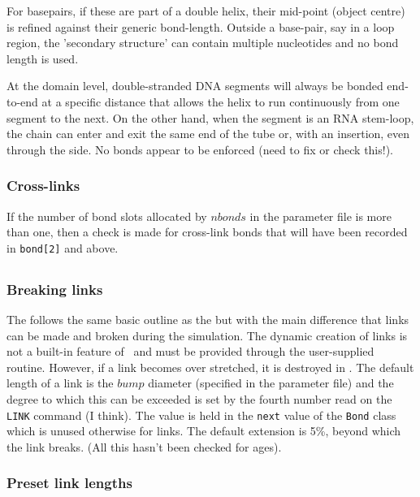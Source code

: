 For basepairs, if these are part of a double helix, their mid-point (object centre)
is refined against their generic bond-length.   Outside a base-pair, say in a loop region,
the 'secondary structure' can contain multiple nucleotides and no bond length is used.

At the domain level, double-stranded DNA segments will always be bonded end-to-end
at a specific distance that allows the helix to run continuously from one segment to
the next.   On the other hand, when the segment is an RNA stem-loop, the chain can enter
and exit the same end of the tube or, with an insertion, even through the side.
No bonds appear to be enforced (need to fix or check this!).

\subsubsection{Cross-links}

If the number of bond slots allocated by $nbonds$ in the parameter file is more than one,
then a check is made for cross-link bonds that will have been recorded in {\tt bond[2]}
and above.  


\subsection{}

\subsubsection{Breaking links}

The  follows the same basic outline as the  but with the main
difference that links can be made and broken during the simulation.   The dynamic creation
of links is not a built-in feature of \NAME\ and must be provided through the user-supplied
 routine.   However, if a link becomes over stretched, it is destroyed in
.    The default length of a link is the $bump$ diameter (specified in the
parameter file) and the degree to which this can be exceeded is set by the fourth
number read on the {\tt LINK} command (I think).  The value is held in the {\tt next}
value of the {\tt Bond} class which is unused otherwise for links.   The default extension
is 5\%, beyond which the link breaks.  (All this hasn't been checked for ages).

\subsubsection{Preset link lengths}

